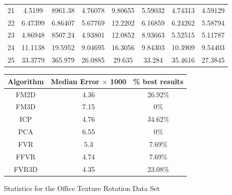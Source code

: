 \begin{figure}
\begin{tabular}{cccccccc}
21 & 4.5199 & 8961.38 & 4.76078 & 9.80655 & 5.59032 & 4.74313 & 4.59129\\
22 & 6.47399 & 6.86407 & 5.67769 & 12.2202 & 6.16859 & 6.24262 & 5.58794\\
23 & 4.86948 & 8507.24 & 4.93801 & 12.0852 & 8.93663 & 5.52515 & 5.11787\\
24 & 11.1138 & 19.5952 & 9.04695 & 16.3056 & 9.84303 & 10.3909 & 9.54403\\
25 & 33.3779 & 365.979 & 26.0885 & 29.635 & 33.284 & 35.4616 & 27.3845\\
\end{tabular}
\vspace{10mm}
\centering
\begin{tabular}{ccc}
\hline
\textbf{Algorithm} & \textbf{Median Error $\times$ 1000} & \textbf{\% best results}\\ \hline
FM2D	& 4.36 & 26.92\%\\
FM3D	& 7.15 & 0\%\\
ICP	& 4.76 & 34.62\%\\
PCA	& 6.55 & 0\%\\
FVR	& 5.3 & 7.69\%\\
FFVR	& 4.74 & 7.69\%\\
FVR3D	& 4.35 & 23.08\%\\
\end{tabular}
\caption{Statistics for the Office Texture Rotation Data Set}
\label{tab:officetexturerotation}
\end{figure} 

